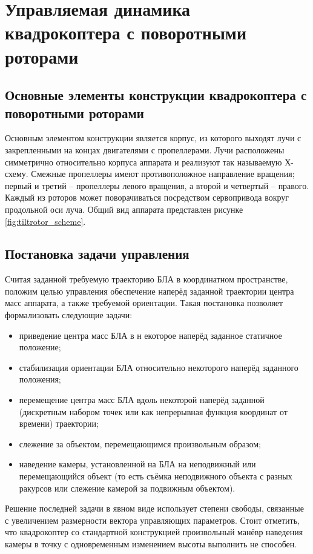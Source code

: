 \chapter{Управляемая динамика квадрокоптера с поворотными роторами}

\section{Основные элементы конструкции квадрокоптера с поворотными роторами}

Основным элементом конструкции является корпус, из которого выходят лучи с закрепленными на концах двигателями с пропеллерами. Лучи расположены симметрично относительно корпуса аппарата и реализуют так называемую Х-схему. Смежные пропеллеры имеют противоположное направление вращения; первый и третий – пропеллеры левого вращения, а второй и четвертый – правого. Каждый из роторов может поворачиваться посредством сервопривода вокруг продольной оси луча. Общий вид аппарата представлен рисунке \ref{fig:tiltrotor_scheme}.

\section{Постановка задачи управления}

Считая заданной требуемую траекторию БЛА в координатном пространстве, положим целью управления обеспечение наперёд заданной траектории центра масс аппарата, а также требуемой ориентации. Такая постановка позволяет формализовать следующие задачи:
\begin{itemize}
\item приведение центра масс БЛА в н	екоторое наперёд заданное статичное положение;
\item стабилизация ориентации БЛА относительно некоторого наперёд заданного положения;
\item перемещение центра масс БЛА вдоль некоторой наперёд заданной (дискретным набором точек или как непрерывная функция координат от времени) траектории;
\item слежение за объектом, перемещающимся произвольным образом;
\item наведение камеры, установленной на БЛА на неподвижный или перемещающийся объект (то есть съёмка неподвижного объекта с разных ракурсов или слежение камерой за подвижным объектом).
\end{itemize}

Решение последней задачи в явном виде использует степени свободы, связанные с увеличением размерности вектора управляющих параметров. Стоит отметить, что квадрокоптер со стандартной конструкцией произвольный манёвр наведения камеры в точку с одновременным изменением высоты выполнить не способен.

